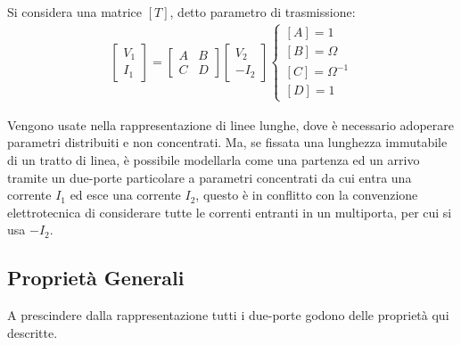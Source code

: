 \documentclass{article}
\numberwithin{equation}{subsection}
\begin{document}
Si considera una matrice $[T]$, detto parametro di trasmissione:
\begin{gather*}
    \begin{bmatrix}
        V_1\\I_1
    \end{bmatrix}=\begin{bmatrix}
        A&B\\C&D
    \end{bmatrix}\begin{bmatrix}
        V_2\\-I_2
    \end{bmatrix}
    \begin{cases}
        [A]=1\\
        [B]=\Omega\\
        [C]=\Omega^{-1}\\
        [D]=1
    \end{cases}
\end{gather*}

Vengono usate nella rappresentazione di linee lunghe, dove è necessario adoperare parametri distribuiti e non concentrati. Ma, se fissata una lunghezza immutabile 
di un tratto di linea, è possibile modellarla come una partenza ed un arrivo tramite un 
due-porte particolare a parametri concentrati da cui entra una corrente $I_1$ ed esce una corrente $I_2$, questo è in conflitto con la convenzione elettrotecnica di considerare 
tutte le correnti entranti in un multiporta, per cui si usa $-I_2$. 

\subsection{Proprietà Generali}

A prescindere dalla rappresentazione tutti i due-porte godono delle proprietà qui descritte. 

\begin{center}
\end{center}
\end{document}
